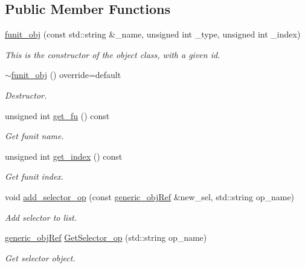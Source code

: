 \subsection*{Public Member Functions}
\begin{DoxyCompactItemize}
\item 
\hyperlink{classfunit__obj_a7ebd13baff863eb4df6277e64e915be0}{funit\+\_\+obj} (const std\+::string \&\+\_\+name, unsigned int \+\_\+type, unsigned int \+\_\+index)
\begin{DoxyCompactList}\small\item\em This is the constructor of the object class, with a given id. \end{DoxyCompactList}\item 
\hyperlink{classfunit__obj_aba644422f3c038297067fa9ad85b09f3}{$\sim$funit\+\_\+obj} () override=default
\begin{DoxyCompactList}\small\item\em Destructor. \end{DoxyCompactList}\item 
unsigned int \hyperlink{classfunit__obj_a23c243f9f790d6364a4faa66443ca357}{get\+\_\+fu} () const
\begin{DoxyCompactList}\small\item\em Get funit name. \end{DoxyCompactList}\item 
unsigned int \hyperlink{classfunit__obj_a14871aebaa095e49bb0460e7d60c8bb3}{get\+\_\+index} () const
\begin{DoxyCompactList}\small\item\em Get funit index. \end{DoxyCompactList}\item 
void \hyperlink{classfunit__obj_a307845919351a11692708a7f13de20e1}{add\+\_\+selector\+\_\+op} (const \hyperlink{generic__obj_8hpp_acb533b2ef8e0fe72e09a04d20904ca81}{generic\+\_\+obj\+Ref} \&new\+\_\+sel, std\+::string op\+\_\+name)
\begin{DoxyCompactList}\small\item\em Add selector to list. \end{DoxyCompactList}\item 
\hyperlink{generic__obj_8hpp_acb533b2ef8e0fe72e09a04d20904ca81}{generic\+\_\+obj\+Ref} \hyperlink{classfunit__obj_ab683e0c5ccc08ec37d77ea1f1c1ba6f3}{Get\+Selector\+\_\+op} (std\+::string op\+\_\+name)
\begin{DoxyCompactList}\small\item\em Get selector object. \end{DoxyCompactList}\end{DoxyCompactItemize}
